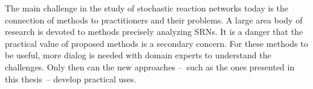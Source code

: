   \vspace{1em}
  The main challenge in the study of stochastic reaction networks
  today is the connection of methods to practitioners and their problems.
  A large area body of research is devoted to methods precisely
  analyzing \acp{SRN}.
  It is a danger that the practical value of proposed methods is a
  secondary concern.
  For these methods to be useful, more dialog is needed with domain
  experts to understand the challenges.
  Only then can the new approaches --~such as the ones presented in
  this thesis~-- develop practical uses.
